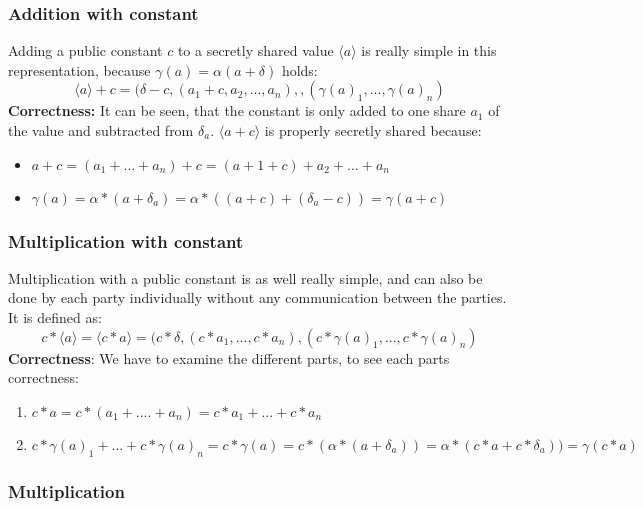 \documentclass[english,runningheads,a4paper]{llncs}[2018/03/10]
\begin{document}
\subsubsection{Addition with constant}
Adding a public constant $c$ to a secretly shared value $ \langle a\rangle $ is really simple in this representation, because \( \gamma (a)=\alpha(a+\delta)\) holds:\\
$$\langle a\rangle+c=(\delta-c,(a_1+c,a_2,...,a_n),,(\gamma (a)_1,...,\gamma (a)_n)$$
\textbf{Correctness:} It can be seen, that the constant is only added to one share $a_1$ of the value and subtracted from \( \delta_a\). \( \langle a+c \rangle \) is properly secretly shared because:
\begin{itemize}
\item $a+c=(a_1+...+a_n)+c=(a+1+c)+a_2+...+a_n$
\item \( \gamma(a)=\alpha*(a+\delta_a)=\alpha*((a+c)+(\delta_a-c))=\gamma(a+c)\)
\end{itemize}

\subsubsection{Multiplication with constant}
Multiplication with a public constant is as well really simple, and can also be done by each party individually without any communication between the parties. It is defined as:\\
$$c*\langle a\rangle=\langle c*a\rangle=(c*\delta,(c*a_1,...,c*a_n),(c*\gamma (a)_1,...,c*\gamma (a)_n)$$
\textbf{Correctness}: We have to examine the different parts, to see each parts correctness:
\begin{enumerate}
\item \(  c*a = c * (a_1+....+a_n) = c*a_1+...+c*a_n \)
\item \( c*\gamma (a)_1+...+c*\gamma (a)_n=c*\gamma (a) = c*(\alpha*(a+\delta_a)) = \alpha*(c*a+c*\delta_a))=\gamma(c*a)\)
\end{enumerate}

\subsubsection{Multiplication}
\end{document}
